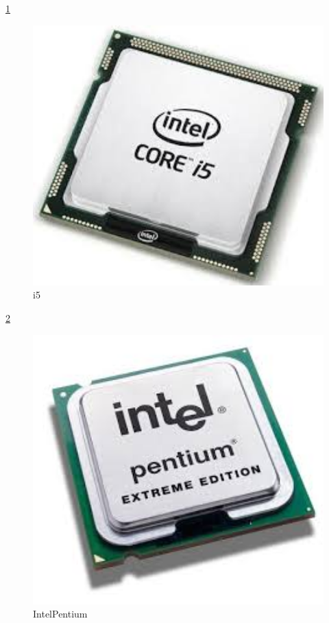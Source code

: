 \ref{i5}
\begin{figure}[ht]
\centerline{\includegraphics[width=1\textwidth]{figures/i5.JPG}}
\caption{i5}
\label{i5}
\end{figure}

\ref{IntelPentium}
\begin{figure}[ht]
\centerline{\includegraphics[width=1\textwidth]{figures/IntelPentium.JPG}}
\caption{IntelPentium}
\label{IntelPentium}
\end{figure}

